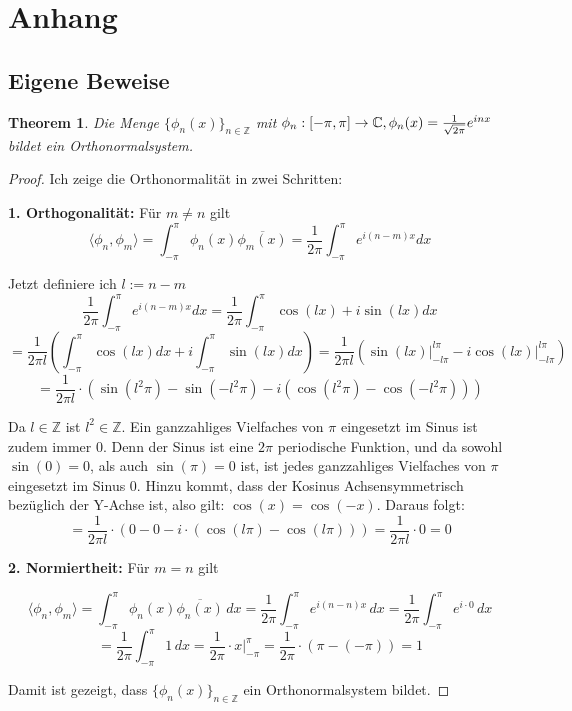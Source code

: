 \documentclass[a4paper,12pt]{article}
\newtheorem{theorem}{Theorem}[section]
\theoremstyle{definition}
\theoremstyle{remark}
\begin{document}
\section{Anhang}
        
\subsection{Eigene Beweise}
\begin{theorem}\label{thm:orthonorm}
Die Menge $\{\phi_n(x)\}_{n\in\mathbb{Z}}$ mit $\phi_n:[-\pi, \pi] \to \mathbb{C}, \\ \phi_n(x) = \frac{1}{\sqrt{2\pi}}e^{inx}$ bildet ein Orthonormalsystem.
\end{theorem}
        
\begin{proof}
Ich zeige die Orthonormalität in zwei Schritten: 
            
\textbf{1. Orthogonalität:}  
Für $m \neq n$ gilt
$$\langle \phi_n, \phi_m \rangle = \int_{-\pi}^{\pi}{\phi_n(x) \overline{\phi_m(x)}} = \frac{1}{2\pi}\int_{-\pi}^\pi{e^{i(n-m)x}dx}$$
        
Jetzt definiere ich $l := n-m$
\[\frac{1}{2\pi}\int_{-\pi}^\pi{e^{i(n-m)x}dx} = \frac{1}{2\pi}\int_{-\pi}^\pi{\cos(lx) + i \sin (lx)} dx\] 
\[= \frac{1}{2\pi l}\left(\int_{-\pi}^\pi{\cos (lx) dx} + i\int_{-\pi}^\pi{ \sin (lx) dx} \right)  = \frac{1}{2\pi l} \left(\sin(lx)\big|_{-l\pi}^{l\pi} - i\cos(lx)\big|_{-l\pi}^{l\pi} \right)\]
\[= \frac{1}{2\pi l} \cdot \left(\sin(l^2\pi) - \sin(-l^2\pi) - i\left(\cos(l^2\pi) - \cos(-l^2\pi)\right)\right) \]
        
Da $l\in \mathbb{Z}$ ist $l^2 \in \mathbb{Z}$. Ein ganzzahliges Vielfaches von $\pi$
eingesetzt im Sinus ist zudem immer 0. Denn der Sinus ist eine $2\pi$ periodische Funktion, und da
sowohl $\sin(0) = 0$, als auch $\sin (\pi) = 0$ ist, ist jedes ganzzahliges Vielfaches von $\pi$ eingesetzt 
im Sinus 0. Hinzu kommt, dass der Kosinus Achsensymmetrisch bezüglich der Y-Achse ist, also gilt:
$\cos (x) =  \cos (-x)$. Daraus folgt:
\[= \frac{1}{2\pi l} \cdot (0 - 0 - i\cdot(\cos(l\pi) - \cos(l\pi))) = \frac{1}{2\pi l} \cdot 0 = 0\]      
        
\textbf{2. Normiertheit:}  
Für $m = n$ gilt
        
\[\langle \phi_n, \phi_m \rangle = \int_{-\pi}^{\pi} \phi_n(x) \overline{\phi_n(x)} \, dx = \frac{1}{2\pi} \int_{-\pi}^{\pi} e^{i(n -n) x}\, dx = \frac{1}{2\pi} \int_{-\pi}^{\pi} e^{i\cdot0} \, dx\]        
\[= \frac{1}{2\pi} \int_{-\pi}^{\pi} 1 \, dx = \frac{1}{2\pi} \cdot x \Big|_{-\pi}^{\pi} = \frac{1}{2\pi} \cdot (\pi-(-\pi)) = 1\]
        
Damit ist gezeigt, dass $\{\phi_n(x)\}_{n\in\mathbb{Z}}$ ein Orthonormalsystem bildet.
\end{proof}
\end{document}
